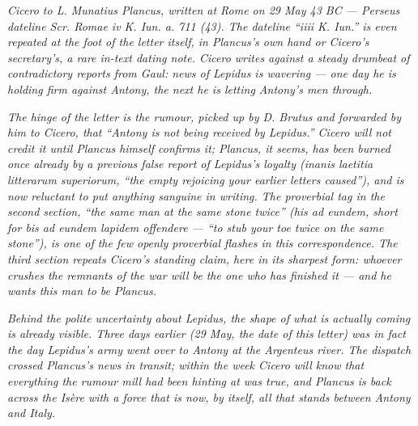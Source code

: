 
\textit{Cicero to L. Munatius Plancus, written at Rome on 29
May 43 BC --- Perseus dateline \textit{Scr. Romae iv K. Iun.
a. 711 (43)}. The dateline ``iiii K. Iun.'' is even repeated
at the foot of the letter itself, in Plancus's own hand or
Cicero's secretary's, a rare in-text dating note. Cicero
writes against a steady drumbeat of contradictory reports
from Gaul: news of Lepidus is wavering --- one day he is
holding firm against Antony, the next he is letting Antony's
men through.}

\textit{The hinge of the letter is the rumour, picked up by
D. Brutus and forwarded by him to Cicero, that ``Antony is
not being received by Lepidus.'' Cicero will not credit it
until Plancus himself confirms it; Plancus, it seems, has
been burned once already by a previous false report of
Lepidus's loyalty (\textit{inanis laetitia litterarum
superiorum}, ``the empty rejoicing your earlier letters
caused''), and is now reluctant to put anything sanguine in
writing. The proverbial tag in the second section, ``the
same man at the same stone twice'' (\textit{his ad eundem},
short for \textit{bis ad eundem lapidem offendere} ---
``to stub your toe twice on the same stone''), is one of
the few openly proverbial flashes in this correspondence.
The third section repeats Cicero's standing claim, here in
its sharpest form: whoever crushes the remnants of the war
will be the one who has finished it --- and he wants this
man to be Plancus.}

\textit{Behind the polite uncertainty about Lepidus, the
shape of what is actually coming is already visible. Three
days earlier (29 May, the date of this letter) was in fact
the day Lepidus's army went over to Antony at the Argenteus
river. The dispatch crossed Plancus's news in transit;
within the week Cicero will know that everything the rumour
mill had been hinting at was true, and Plancus is back
across the Is\`ere with a force that is now, by itself, all
that stands between Antony and Italy.}
